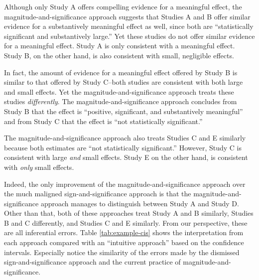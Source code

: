 \documentclass[12pt]{article}
\begin{document}
Although only Study A offers compelling evidence for a meaningful effect, the magnitude-and-significance approach suggests that Studies A and B offer similar evidence for a substantively meaningful effect as well, since both are ``statistically significant and substantively large.''  Yet these studies do not offer similar evidence for a meaningful effect. Study A is only consistent with a meaningful effect. Study B, on the other hand, is also consistent with small, negligible effects.

In fact, the amount of evidence for a meaningful effect offered by Study B is similar to that offered by Study C--both studies are consistent with both large and small effects. Yet the magnitude-and-significance approach treats these studies \emph{differently}. The magnitude-and-significance approach concludes from Study B that the effect is ``positive, significant, and substantively meaningful''  and from Study C that the effect is ``not statistically significant.''

The magnitude-and-significance approach also treats Studies C and E similarly because both estimates are ``not statistically significant.'' However, Study C is consistent with large \emph{and} small effects. Study E on the other hand, is consistent with \emph{only} small effects.

Indeed, the only improvement of the magnitude-and-significance approach over the much maligned sign-and-significance approach is that the magnitude-and-significance approach manages to distinguish between Study A and Study D. Other than that, both of these approaches treat Study A and B similarly, Studies B and C differently, and Studies C and E similarly. From our perspective, these are all inferential errors. Table \ref{tab:example-cis} shows the interpretation from each approach compared with an ``intuitive approach'' based on the confidence intervals. Especially notice the similarity of the errors made by the dismissed sign-and-significance approach and the current practice of magnitude-and-significance.
\end{document}
